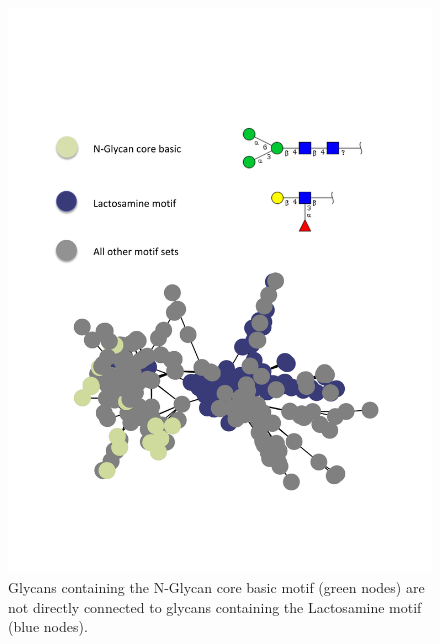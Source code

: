 \documentclass[12pt,a4paper]{article}
\begin{document}
\begin{figure}[H]
\centering 
\includegraphics[scale=0.9]{motif_similarity_exploration/N-Glycan_core_basic_vs_Lactosamine_motif.pdf} 
\caption{Glycans containing the N-Glycan core basic motif (green nodes) are not directly connected to glycans containing the Lactosamine motif (blue nodes).}
\label{fig:N-Glycan_core_basic_vs_Lactosamine_motif}
\end{figure}
\end{document}
